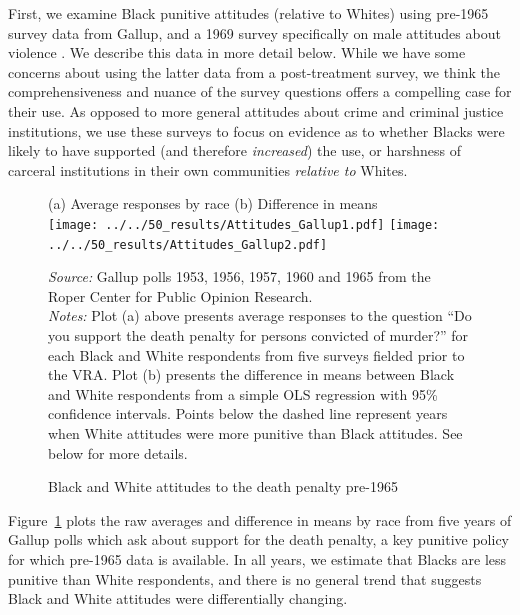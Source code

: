 \documentclass[12pt]{article}
\begin{document}
First, we examine Black punitive attitudes (relative to Whites) using pre-1965 survey data from Gallup, and a 1969 survey specifically on male attitudes about violence .  We describe this data in more detail below.  While we have some concerns about using the latter data from a post-treatment survey, we think the comprehensiveness and nuance of the survey questions offers a compelling case for their use.  As opposed to more general attitudes about crime and criminal justice institutions, we use these surveys to focus on evidence as to whether Blacks were likely to have supported (and therefore \emph{increased}) the use, or harshness of carceral institutions in their own communities \emph{relative to} Whites.

\begin{figure}[h!]
 \begin{center}
 \caption{Black and White attitudes to the death penalty pre-1965}
 \smallskip \smallskip
 \small
 			(a) Average responses by race  \hspace*{1.2in} (b) Difference in means \\

			\texttt{[image: ../../50\_results/Attitudes\_Gallup1.pdf]}
			\texttt{[image: ../../50\_results/Attitudes\_Gallup2.pdf]} \\
			\label{figure_attitudes1}
			 \end{center}
{\scriptsize{\emph{Source:} Gallup polls 1953, 1956, 1957, 1960 and 1965 from the Roper Center for Public Opinion Research.  }} \\
{\scriptsize{\emph{Notes:} Plot (a) above presents average responses to the question ``Do you support the death penalty for persons convicted of murder?'' for each Black and White respondents from five surveys fielded prior to the VRA.  Plot (b) presents the difference in means between Black and White respondents from a simple OLS regression with 95\% confidence intervals.  Points below the dashed line represent years when White attitudes were more punitive than Black attitudes. See below for more details. \singlespacing }}
			\end{figure} \normalsize




Figure~\ref{figure_attitudes1} plots the raw averages and difference in means by race from five years of Gallup polls which ask about support for the death penalty, a key punitive policy for which pre-1965 data is available.  In all years, we estimate that Blacks are less punitive than White respondents, and there is no general trend that suggests Black and White attitudes were differentially changing.
\end{document}
